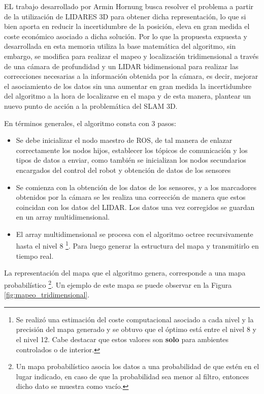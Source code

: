 EL trabajo desarrollado por Armin Hornung busca resolver el problema a partir de la utilización de LIDARES 3D para obtener dicha representación, lo que si bien aporta en reducir la incertidumbre de la posición, eleva en gran medida el coste económico asociado a dicha solución. Por lo que la propuesta expuesta y desarrollada en esta memoria utiliza la base matemática del algoritmo, sin embargo, se modifica para realizar el mapeo y localización tridimensional a través de una cámara de profundidad y un LIDAR bidimensional para realizar las correcciones necesarias a la información obtenida por la cámara, es decir, mejorar el asociamiento de los datos sin una aumentar en gran medida la incertidumbre del algoritmo a la hora de localizarse en el mapa y de esta manera, plantear un nuevo punto de acción a la problemática del SLAM 3D.

En términos generales, el algoritmo consta con 3 pasos:
\begin{itemize}
    \item Se debe inicializar el nodo maestro de ROS, de tal manera de enlazar correctamente los nodos hijos, establecer los tópicos de comunicación y los tipos de datos a enviar, como también se inicializan los nodos secundarios encargados del control del robot y obtención de datos de los sensores
    \item Se comienza con la obtención de los datos de los sensores, y a los marcadores obtenidos por la cámara se les realiza una corrección de manera que estos coincidan con los datos del LIDAR. Los datos una vez corregidos se guardan en un array multidimensional.
    \item El array multidimensional se procesa con el algoritmo octree recursivamente hasta el nivel 8 \footnote{ Se realizó una estimación del coste computacional asociado a cada nivel y la precisión del mapa generado y se obtuvo que el óptimo está entre el nivel 8 y el nivel 12. Cabe destacar que estos valores son \textbf{solo} para ambientes controlados o de interior.}. Para luego generar la estructura del mapa y transmitirlo en tiempo real.
\end{itemize}

La representación del mapa que el algoritmo genera, corresponde a una mapa probabilístico \footnote{Un mapa probabilístico asocia los datos a una probabilidad de que estén en el lugar indicado, en caso de que la probabilidad sea menor al filtro, entonces dicho dato se muestra como vacío.}. Un ejemplo de este mapa se puede observar en la Figura \ref{fig:mapeo_tridimensional}.

